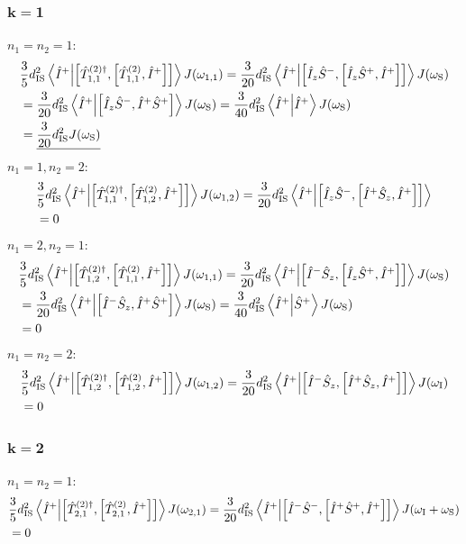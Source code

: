 \begin{appendixtext}
\subsubsection{$\mathbf{k = 1}$}
$n_1 = n_2 = 1$:
\begin{align*}
&\frac{3}{5} d_{\text{IS}}^2 \bra{\hat{I}^+} \ket{\comm{\hat{T}_{1, 1}^{(2) \dagger}}{\comm{\hat{T}_{1,1}^{(2)}}{\hat{I}^+}}} J(\omega_{1,1}) = \frac{3}{20} d_{\text{IS}}^2 \bra{\hat{I}^+} \ket{\comm{\hat{I}_z \hat{S}^-}{\comm{\hat{I}_z \hat{S}^+}{\hat{I}^+}}} J(\omega_{\text{S}}) \\
&= \frac{3}{20} d_{\text{IS}}^2 \bra{\hat{I}^+} \ket{\comm{\hat{I}_z \hat{S}^-}{\hat{I}^+ \hat{S}^+}} J(\omega_{\text{S}}) = \frac{3}{40} d_{\text{IS}}^2 \bra{\hat{I}^+} \ket{\hat{I}^+} J(\omega_{\text{S}}) \\
&= \underline{\frac{3}{20} d_{\text{IS}}^2 J(\omega_{\text{S}})}
\end{align*}
$n_1 = 1, n_2 = 2$:
\begin{align*}
&\frac{3}{5} d_{\text{IS}}^2 \bra{\hat{I}^+} \ket{\comm{\hat{T}_{1, 1}^{(2) \dagger}}{\comm{\hat{T}_{1,2}^{(2)}}{\hat{I}^+}}} J(\omega_{1,2}) = \frac{3}{20} d_{\text{IS}}^2 \bra{\hat{I}^+} \ket{\comm{\hat{I}_z \hat{S}^-}{\comm{\hat{I}^+ \hat{S}_z}{\hat{I}^+}}} \\
& = 0
\end{align*}
$n_1 = 2, n_2 = 1$:
\begin{align*}
&\frac{3}{5} d_{\text{IS}}^2 \bra{\hat{I}^+} \ket{\comm{\hat{T}_{1, 2}^{(2) \dagger}}{\comm{\hat{T}_{1,1}^{(2)}}{\hat{I}^+}}} J(\omega_{1,1}) = \frac{3}{20} d_{\text{IS}}^2 \bra{\hat{I}^+} \ket{\comm{\hat{I}^- \hat{S}_z}{\comm{\hat{I}_z \hat{S}^+}{\hat{I}^+}}} J(\omega_{\text{S}}) \\
&= \frac{3}{20} d_{\text{IS}}^2 \bra{\hat{I}^+} \ket{\comm{\hat{I}^- \hat{S}_z}{\hat{I}^+ \hat{S}^+}} J(\omega_{\text{S}}) = \frac{3}{40} d_{\text{IS}}^2 \bra{\hat{I}^+} \ket{\hat{S}^+} J(\omega_{\text{S}}) \\
& = 0
\end{align*}
$n_1 = n_2 = 2$:
\begin{align*}
&\frac{3}{5} d_{\text{IS}}^2 \bra{\hat{I}^+} \ket{\comm{\hat{T}_{1, 2}^{(2) \dagger}}{\comm{\hat{T}_{1,2}^{(2)}}{\hat{I}^+}}} J(\omega_{1,2}) = \frac{3}{20} d_{\text{IS}}^2 \bra{\hat{I}^+} \ket{\comm{\hat{I}^- \hat{S}_z}{\comm{\hat{I}^+ \hat{S}_z}{\hat{I}^+}}} J(\omega_{\text{I}}) \\
&= 0
\end{align*}
\subsubsection{$\mathbf{k = 2}$}
$n_1 = n_2 = 1$:
\begin{align*}
&\frac{3}{5} d_{\text{IS}}^2 \bra{\hat{I}^+} \ket{\comm{\hat{T}_{2, 1}^{(2) \dagger}}{\comm{\hat{T}_{2,1}^{(2)}}{\hat{I}^+}}} J(\omega_{2,1}) = \frac{3}{20} d_{\text{IS}}^2 \bra{\hat{I}^+} \ket{\comm{\hat{I}^- \hat{S}^-}{\comm{\hat{I}^+ \hat{S}^+}{\hat{I}^+}}} J(\omega_{\text{I}} + \omega_{\text{S}}) \\
&= 0
\end{align*}

\end{appendixtext}
